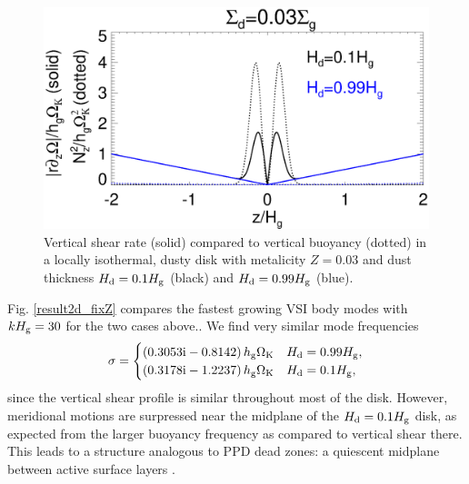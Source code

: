 \begin{figure}
  \includegraphics[width=\linewidth]{figures/compare_vshear_Nz2_fixZ} 
  \caption{Vertical shear rate (solid) compared to vertical buoyancy
    (dotted) in a locally isothermal, dusty disk 
    with metalicity $Z=0.03$ and dust thickness $H_\mathrm{d}=0.1H_\mathrm{g}$
    (black) and $H_\mathrm{d}=0.99H_\mathrm{g}$ (blue). 
    \label{compare_vshear_fixZ}
    }
\end{figure}

Fig. \ref{result2d_fixZ} compares the fastest growing VSI body modes  
with $kH_\mathrm{g}=30$ for the two cases above..   
We find very similar mode 
frequencies 
\begin{align*}
  \sigma = \begin{cases}
    \left(0.3053\mathrm{i} - 0.8142\right)h_\mathrm{g}\Omega_{\rm K} & H_\mathrm{d}=0.99H_\mathrm{g}, \\
    \left(0.3178\mathrm{i} - 1.2237\right)h_\mathrm{g}\Omega_{\rm K} & H_\mathrm{d}=0.1H_\mathrm{g},
  \end{cases}
\end{align*}
since the vertical shear profile is similar throughout most of the
disk. However, meridional motions are surpressed near the midplane of
the $H_\mathrm{d}=0.1H_\mathrm{g}$ disk, as expected from the larger buoyancy frequency
as compared to vertical shear there. This leads to a structure
analogous to PPD dead zones: a quiescent midplane between active
surface layers \citep{gammie96}.  


